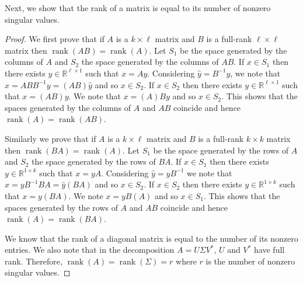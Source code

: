 \documentclass[11pt]{article}
\DeclareMathOperator{\rank}{rank}
\newcommand{\real}{\mathbb{R}} %
\begin{document}
Next, we show that the rank of a matrix is equal to its number of nonzero singular values.
\begin{proof}
    We first prove that if $A$ is a $k\times \ell$ matrix and $B$ is a full-rank $\ell \times \ell$ matrix then $\rank(AB)=\rank(A)$.
    Let $S_1$ be the space generated by the columns of $A$ and $S_2$ the space generated by the columns of $AB$.
    If $x\in S_1$ then there exists $y\in \real^{\ell \times 1}$ such that $x=Ay$.
    Considering $\hat{y}=B^{-1}y$, we note that $x=ABB^{-1}y=(AB)\hat{y}$ and so $x\in S_2$. If $x\in S_2$ then there exists $y\in \real^{\ell\times 1}$ such that $x=(AB)y$.
    We note that $x=(A)By$ and so $x\in S_2$. This shows that the spaces generated by the columns of $A$ and $AB$ coincide and hence $\rank(A)=\rank(AB)$.
    
    Similarly we prove that if $A$ is a $k \times \ell$ matrix and $B$ is a full-rank $k\times k$ matrix then $\rank(BA)=\rank(A)$.
    Let $S_1$ be the space generated by the rows of $A$ and $S_2$ the space generated by the rows of $BA$.
    If $x\in S_1$ then there exists $y\in \real^{1\times k}$ such that $x=yA$. Considering $\hat{y}=yB^{-1}$ we note that $x=yB^{-1}BA=\hat{y}(BA)$ and so $x\in S_2$. If $x\in S_2$ then there exists $y\in \real^{1\times k}$ such that $x=y(BA)$.
    We note $x=yB(A)$ and so $x\in S_1$. This shows that the spaces generated by the rows of $A$ and $AB$ coincide and hence $\rank(A)=\rank(BA)$.
    
	We know that the rank of a diagonal matrix is equal to the number of its nonzero entries.
	We also note that in the decomposition \(A = U \Sigma V^*\), \(U\) and \(V^*\) have full rank.
	Therefore, \(\rank(A) = \rank(\Sigma) = r\) where $r$ is the number of nonzero singular values.
\end{proof}
\end{document}
